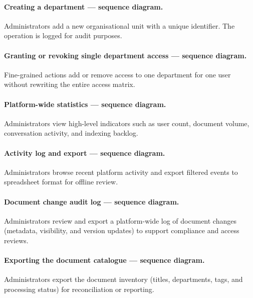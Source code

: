 \paragraph{Creating a department --- sequence diagram.}
Administrators add a new organisational unit with a unique identifier. The
operation is logged for audit purposes.

\paragraph{Granting or revoking single department access --- sequence diagram.}
Fine-grained actions add or remove access to one department for one user without
rewriting the entire access matrix.

\paragraph{Platform-wide statistics --- sequence diagram.}
Administrators view high-level indicators such as user count, document volume,
conversation activity, and indexing backlog.

\paragraph{Activity log and export --- sequence diagram.}
Administrators browse recent platform activity and export filtered events to
spreadsheet format for offline review.

\paragraph{Document change audit log --- sequence diagram.}
Administrators review and export a platform-wide log of document changes
(metadata, visibility, and version updates) to support compliance and access
reviews.

\paragraph{Exporting the document catalogue --- sequence diagram.}
Administrators export the document inventory (titles, departments, tags, and
processing status) for reconciliation or reporting.


